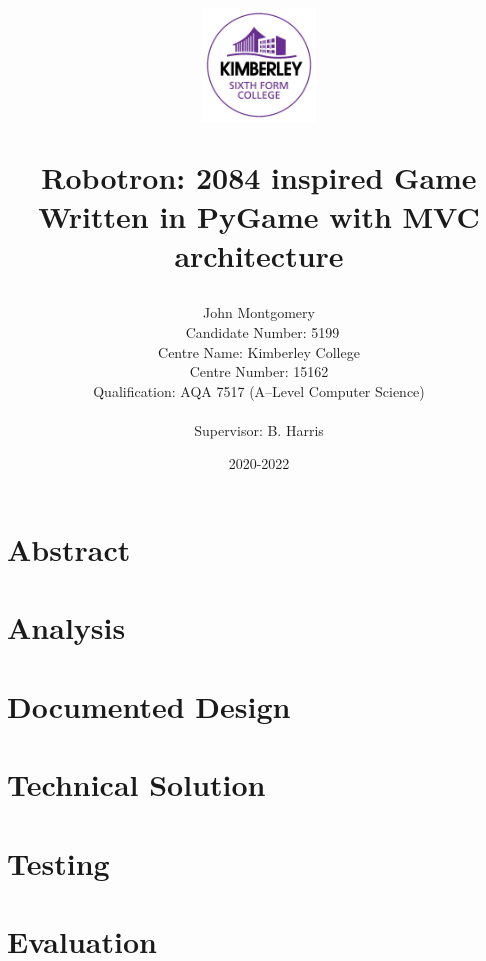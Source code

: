 \documentclass[a4paper, 11pt]{report}
\title{%
    
    \begin{center}
        \includegraphics[width=3cm]{kimberley.png}
        \centering
    \end{center}
  Robotron: 2084 inspired Game \\
  \large Written in PyGame with MVC architecture}
\author{{\Large John Montgomery}\\ \ 
Candidate Number: 5199\\
Centre Name: Kimberley College\\
Centre Number: 15162\\
Qualification: AQA 7517 (A--Level Computer Science)\\ \\
{\small Supervisor: B. Harris}}
\date{2020-2022}
\begin{document}
\maketitle

\newpage
\tableofcontents\thispagestyle{empty}
\newpage
\listoffigures\thispagestyle{empty}
\newpage
\chapter{Abstract}
    

\chapter{Analysis}
    

\chapter{Documented Design}
    

\chapter{Technical Solution}
    

\chapter{Testing}
    
\chapter{Evaluation}
    
\end{document}

